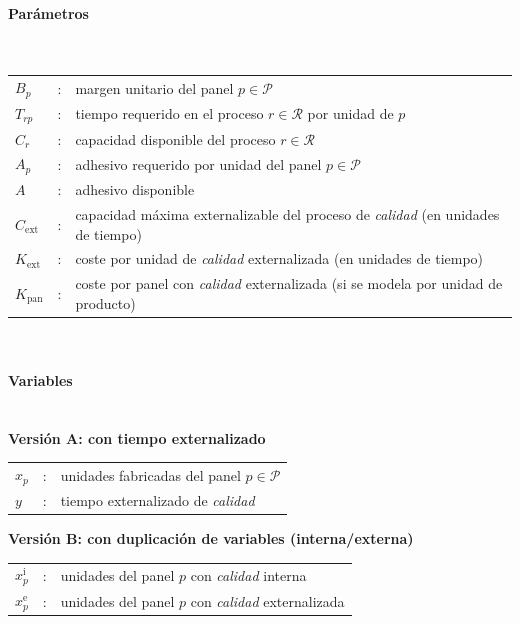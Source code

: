 \paragraph{Parámetros}\mbox{}\\
\begin{tabular}{l c l}
    $B_p$           & : & margen unitario del panel $p \in \mathcal{P}$ \\
    $T_{rp}$        & : & tiempo requerido en el proceso $r \in \mathcal{R}$ por unidad de $p$ \\
    $C_r$           & : & capacidad disponible del proceso $r \in \mathcal{R}$ \\
    $A_p$           & : & adhesivo requerido por unidad del panel $p \in \mathcal{P}$ \\
    $A$             & : & adhesivo disponible \\
    $C_{\mathrm{ext}}$ & : & capacidad máxima externalizable del proceso de \emph{calidad} (en unidades de tiempo) \\
    $K_{\mathrm{ext}}$ & : & coste por unidad de \emph{calidad} externalizada (en unidades de tiempo) \\
    $K_{\mathrm{pan}}$ & : & coste por panel con \emph{calidad} externalizada (si se modela por unidad de producto) \\
\end{tabular}
\\[0.25cm]

\paragraph{Variables}\mbox{}\\
\textbf{Versión A: con tiempo externalizado}\\
\begin{tabular}{l c l}
    $x_p$ & : & unidades fabricadas del panel $p \in \mathcal{P}$ \\
    $y$   & : & tiempo externalizado de \emph{calidad} \\
\end{tabular}

\noindent\textbf{Versión B: con duplicación de variables (interna/externa)}\\
\begin{tabular}{l c l}
    $x_p^{\mathrm{i}}$ & : & unidades del panel $p$ con \emph{calidad} interna \\
    $x_p^{\mathrm{e}}$ & : & unidades del panel $p$ con \emph{calidad} externalizada \\
\end{tabular}
\\[0.25cm]

